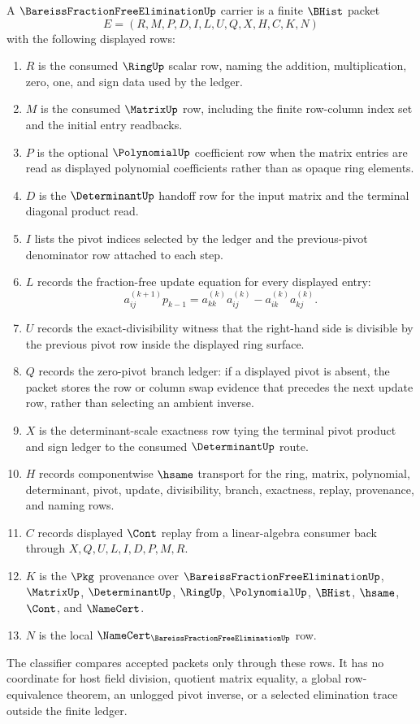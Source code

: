 \begin{definition}
\label{def:bareiss-fraction-free-elimination-carrier}
A $\BareissFractionFreeEliminationUp$ carrier is a finite $\BHist$ packet
$$
E=(R,M,P,D,I,L,U,Q,X,H,C,K,N)
$$
with the following displayed rows:
\begin{enumerate}
\item $R$ is the consumed $\RingUp$ scalar row, naming the addition, multiplication, zero, one, and sign data used by the ledger.
\item $M$ is the consumed $\MatrixUp$ row, including the finite row-column index set and the initial entry readbacks.
\item $P$ is the optional $\PolynomialUp$ coefficient row when the matrix entries are read as displayed polynomial coefficients rather than as opaque ring elements.
\item $D$ is the $\DeterminantUp$ handoff row for the input matrix and the terminal diagonal product read.
\item $I$ lists the pivot indices selected by the ledger and the previous-pivot denominator row attached to each step.
\item $L$ records the fraction-free update equation for every displayed entry:
$$
a^{(k+1)}_{ij}p_{k-1}=a^{(k)}_{kk}a^{(k)}_{ij}-a^{(k)}_{ik}a^{(k)}_{kj}.
$$
\item $U$ records the exact-divisibility witness that the right-hand side is divisible by the previous pivot row inside the displayed ring surface.
\item $Q$ records the zero-pivot branch ledger: if a displayed pivot is absent, the packet stores the row or column swap evidence that precedes the next update row, rather than selecting an ambient inverse.
\item $X$ is the determinant-scale exactness row tying the terminal pivot product and sign ledger to the consumed $\DeterminantUp$ route.
\item $H$ records componentwise $\hsame$ transport for the ring, matrix, polynomial, determinant, pivot, update, divisibility, branch, exactness, replay, provenance, and naming rows.
\item $C$ records displayed $\Cont$ replay from a linear-algebra consumer back through $X,Q,U,L,I,D,P,M,R$.
\item $K$ is the $\Pkg$ provenance over $\BareissFractionFreeEliminationUp$, $\MatrixUp$, $\DeterminantUp$, $\RingUp$, $\PolynomialUp$, $\BHist$, $\hsame$, $\Cont$, and $\NameCert$.
\item $N$ is the local $\NameCert_{\BareissFractionFreeEliminationUp}$ row.
\end{enumerate}
The classifier compares accepted packets only through these rows. It has no coordinate for host field division, quotient matrix equality, a global row-equivalence theorem, an unlogged pivot inverse, or a selected elimination trace outside the finite ledger.
\end{definition}

